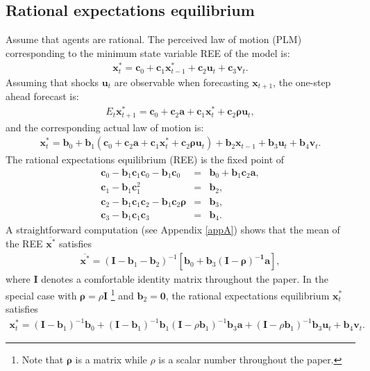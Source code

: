 \subsection*{Rational expectations equilibrium}
Assume that agents are rational. The  perceived law of motion (PLM) corresponding to the minimum state variable REE of the model is:
\begin{eqnarray}
{\pmb x}_t^*={\pmb c}_0+{\pmb c}_1{\pmb x}_{t-1}^*+{\pmb c}_2 {\pmb u}_t+{\pmb c}_3{\pmb v_t}.
\end{eqnarray}
Assuming that shocks ${\pmb u}_t$ are observable when forecasting ${\pmb x}_{t+1}$,  the one-step ahead forecast is:
\begin{eqnarray}
{ E}_t{\pmb x}_{t+1}^*={\pmb c}_0+{\pmb c}_2{\pmb a}+{\pmb c}_1{\pmb x}_{t}^*+{\pmb c}_2{\pmb\rho} {\pmb u}_t,
\end{eqnarray}
and the corresponding actual law of motion is:
\begin{eqnarray}
{\pmb x}_t^*={\pmb b}_0+{\pmb b}_1({\pmb c}_0+{\pmb c}_2{\pmb a}+{\pmb c}_1{\pmb x}_{t}^*+{\pmb c}_2{\pmb\rho} {\pmb u}_t)+ {\pmb b}_2{\pmb x}_{t-1}+{\pmb b}_3{\pmb u}_t + {\pmb b}_4{\pmb v}_t.
\end{eqnarray}
The rational expectations equilibrium (REE) is the fixed point of
\begin{eqnarray}
{\pmb c}_0-{\pmb b}_1{\pmb c}_1{\pmb c}_0-{\pmb b}_1{\pmb c}_0&=&{\pmb b}_0+{\pmb b}_1{\pmb c}_2{\pmb a},\label{reec0}\\
{\pmb c}_1-{\pmb b}_1{\pmb c}_1^2&=&{\pmb b}_2,\label{reec1}\\
{\pmb c}_2-{\pmb b}_1{\pmb c}_1{\pmb c}_2-{\pmb b}_1{\pmb c}_2{\pmb \rho}&=&{\pmb b}_3,\label{reec2}\\
{\pmb c}_3-{\pmb b}_1{\pmb c}_1{\pmb c}_3&=&{\pmb b}_4.\label{reec3}
\end{eqnarray}
A straightforward computation (see Appendix \ref{appA}) shows that the mean of the REE $\overline{\pmb x^*}$ satisfies
\begin{eqnarray}\label{nreem}
\overline {\pmb x^*}=({\pmb I}-{\pmb b}_1-{\pmb b}_2)^{-1}[\pmb b_0+\pmb b_3\pmb{(I-\pmb\rho)^{-1}a}],
\end{eqnarray}
where $\pmb I$ denotes a comfortable identity matrix throughout the paper. In the special case with ${\pmb \rho}=\rho{\pmb I}$ \footnote{Note that $\pmb
\rho$ is a matrix while $\rho$ is a scalar number throughout the paper.} and ${\pmb b}_2={\pmb 0}$, the rational
expectations equilibrium ${\pmb x}_t^*$ satisfies
\begin{eqnarray}\label{xstar0}
{\pmb x}_t^*=(\pmb I-{\pmb b}_1)^{-1}{\pmb b}_0+(\pmb I-{\pmb b}_1)^{-1}{\pmb b}_1(\pmb I-\rho{\pmb b}_1)^{-1}{\pmb b}_3{\pmb a}+(\pmb I-\rho{\pmb b}_1)^{-1}{\pmb b}_3{\pmb u}_t+{\pmb b}_4{\pmb v}_t.
\end{eqnarray}
